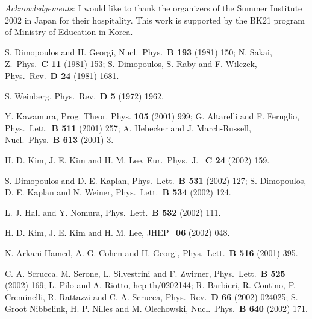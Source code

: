 \documentclass[a4paper,11pt]{article}
\begin{document}
\vskip 0.5cm
\noindent
{\it Acknowledgements}: I would like to thank the organizers of the Summer 
Institute 2002 in Japan for their hospitality. This work is supported 
by the BK21 program of Ministry of Education in Korea.

\begin{thebibliography}{99}

\def\apj#1#2#3{Astrophys.\ J.\ {\bf #1} (#2) #3}
\def\ijmp#1#2#3{Int.\ J.\ Mod.\ Phys.\ {\bf #1} (#2) #3}
\def\mpl#1#2#3{Mod.\ Phys.\ Lett.\ {\bf #1} (#2) #3}
\def\nat#1#2#3{Nature\ {\bf #1} (#2) #3}
\def\npb#1#2#3{Nucl.\ Phys.\ {\bf B #1} (#2) #3}
\def\plb#1#2#3{Phys.\ Lett.\ {\bf B #1} (#2) #3}
\def\prd#1#2#3{Phys.\ Rev.\ {\bf D #1} (#2) #3}
\def\prl#1#2#3{Phys.\ Rev.\ Lett.\ {\bf #1} (#2) #3}
\def\prt#1#2#3{Phys.\ Rep.\ {\bf #1} (#2) #3}
\def\sjnp#1#2#3{Sov.\ J.\ Nucl.\ Phys.\ {\bf #1} (#2) #3}
\def\zp#1#2#3{Z.\ Phys.\ {\bf C #1} (#2) #3}
\def\jhep#1#2#3{JHEP \ {\bf #1} (#2) #3}
\def\epjc#1#2#3{Eur.\ Phys.\ J. \ {\bf C #1} (#2) #3}

 S. Dimopoulos and H. Georgi, \npb{193}{1981}{150};
N. Sakai, \zp{11}{1981}{153}; S. Dimopoulos, S. Raby and F. Wilczek, 
\prd{24}{1981}{1681}.

 S. Weinberg, \prd{5}{1972}{1962}.

 Y. Kawamura, Prog. Theor. Phys. {\bf 105} (2001) 999;
G. Altarelli and F. Feruglio, \plb{511}{2001}{257}; A. Hebecker and 
J. March-Russell, \npb{613}{2001}{3}.

 H. D. Kim, J. E. Kim and H. M. Lee, \epjc{24}{2002}{159}. 

 S. Dimopoulos and D. E. Kaplan, \plb{531}{2002}{127};
S. Dimopoulos, D. E. Kaplan and N. Weiner, \plb{534}{2002}{124}.

 L. J. Hall and Y. Nomura, \plb{532}{2002}{111}.

 H. D. Kim, J. E. Kim and H. M. Lee, \jhep{06}{2002}{048}.

 N. Arkani-Hamed, A. G. Cohen and H. Georgi, 
\plb{516}{2001}{395}.

 C. A. Scrucca. M. Serone, L. Silvestrini and F. Zwirner, 
\plb{525}{2002}{169}; L. Pilo and A. Riotto, hep-th/0202144; R. Barbieri,
R. Contino, P. Creminelli, R. Rattazzi and C. A. Scrucca, 
\prd{66}{2002}{024025}; S. Groot Nibbelink, H. P. Nilles and M. Olechowski,
\npb{640}{2002}{171}.

\end{thebibliography}
\end{document}
